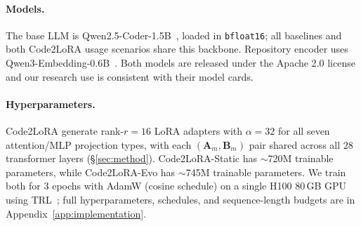 \documentclass[11pt]{article}
\newcommand{\codelora}{Code2LoRA\xspace}
\newcommand{\codelorastatic}{\codelora-Static\xspace}
\newcommand{\codeloraevo}{\codelora-Evo\xspace}
\begin{document}
\paragraph{Models.}
The base LLM is Qwen2.5-Coder-1.5B~\cite{hui2024qwen25coder}, loaded in \texttt{bfloat16}; all baselines and both \codelora{} usage scenarios share this backbone.
Repository encoder uses Qwen3-Embedding-0.6B~\cite{zhang2025qwen3embedding}. %
Both models are released under the Apache 2.0 license and our research use is consistent with their model cards.

\paragraph{Hyperparameters.}
\codelora{} generate rank-$r{=}16$ LoRA adapters with $\alpha{=}32$ for all seven attention/MLP projection types, with each $(\mathbf{A}_m, \mathbf{B}_m)$ pair shared across all $28$ transformer layers (\S\ref{sec:method}).
\codelorastatic{} has ${\sim}$720M trainable parameters, while \codeloraevo{} has ${\sim}$745M trainable parameters.
We train both for 3 epochs with AdamW (cosine schedule) on a single H100 80\,GB GPU using TRL~\cite{vonwerra2022trl}; full hyperparameters, schedules, and sequence-length budgets are in Appendix~\ref{app:implementation}.
\end{document}
